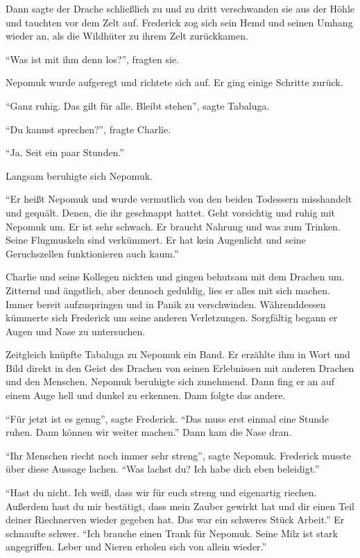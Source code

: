 Dann sagte der Drache schließlich zu und zu dritt verschwanden sie aus der Höhle und tauchten vor dem Zelt auf. Frederick zog sich sein Hemd und seinen Umhang wieder an, als die Wildhüter zu ihrem Zelt zurückkamen.

\enquote{Was ist mit ihm denn los?}, fragten sie.

Nepomuk wurde aufgeregt und richtete sich auf. Er ging einige Schritte zurück.

\enquote{Ganz ruhig. Das gilt für alle. Bleibt stehen}, sagte Tabaluga.

\enquote{Du kannst sprechen?}, fragte Charlie.

\enquote{Ja. Seit ein paar Stunden.}

Langsam beruhigte sich Nepomuk.

\enquote{Er heißt Nepomuk und wurde vermutlich von den beiden Todessern misshandelt und gequält. Denen, die ihr geschnappt hattet. Geht vorsichtig und ruhig mit Nepomuk um. Er ist sehr schwach. Er braucht Nahrung und was zum Trinken. Seine Flugmuskeln sind verkümmert. Er hat kein Augenlicht und seine Geruchszellen funktionieren auch kaum.}

Charlie und seine Kollegen nickten und gingen behutsam mit dem Drachen um. Zitternd und ängstlich, aber dennoch geduldig, lies er alles mit sich machen. Immer bereit aufzuspringen und in Panik zu verschwinden. Währenddessen kümmerte sich Frederick um seine anderen Verletzungen. Sorgfältig begann er Augen und Nase zu untersuchen.

Zeitgleich knüpfte Tabaluga zu Nepomuk ein Band. Er erzählte ihm in Wort und Bild direkt in den Geist des Drachen von seinen Erlebnissen mit anderen Drachen und den Menschen. Nepomuk beruhigte sich zunehmend. Dann fing er an auf einem Auge hell und dunkel zu erkennen. Dann folgte das andere.

\enquote{Für jetzt ist es genug}, sagte Frederick. \enquote{Das muss erst einmal eine Stunde ruhen. Dann können wir weiter machen.} Dann kam die Nase dran.

\enquote{Ihr Menschen riecht noch immer sehr streng}, sagte Nepomuk. Frederick musste über diese Aussage lachen. \enquote{Was lachst du? Ich habe dich eben beleidigt.}

\enquote{Hast du nicht. Ich weiß, dass wir für euch streng und eigenartig riechen. Außerdem hast du mir bestätigt, dass mein Zauber gewirkt hat und dir einen Teil deiner Riechnerven wieder gegeben hat. Das war ein schweres Stück Arbeit.} Er schnaufte schwer. \enquote{Ich brauche einen Trank für Nepomuk. Seine Milz ist stark angegriffen. Leber und Nieren erholen sich von allein wieder.}

